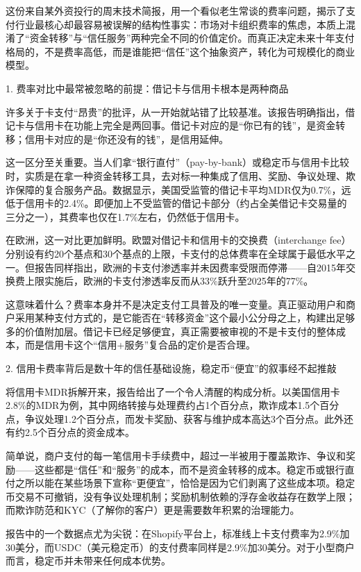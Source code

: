 \documentclass[11pt]{ctexart}
\begin{document}
这份来自某外资投行的周末技术简报，用一个看似老生常谈的费率问题，揭示了支付行业最核心却最容易被误解的结构性事实：市场对卡组织费率的焦虑，本质上混淆了“资金转移”与“信任服务”两种完全不同的价值定价。而真正决定未来十年支付格局的，不是费率高低，而是谁能把“信任”这个抽象资产，转化为可规模化的商业模型。

1. 费率对比中最常被忽略的前提：借记卡与信用卡根本是两种商品

许多关于卡支付“昂贵”的批评，从一开始就站错了比较基准。该报告明确指出，借记卡与信用卡在功能上完全是两回事。借记卡对应的是“你已有的钱”，是资金转移；信用卡对应的是“你还没有的钱”，是信用延伸。

这一区分至关重要。当人们拿“银行直付”（pay-by-bank）或稳定币与信用卡比较时，实质是在拿一种资金转移工具，去对标一种集成了信用、奖励、争议处理、欺诈保障的复合服务产品。数据显示，美国受监管的借记卡平均MDR仅为0.7\%，远低于信用卡的2.4\%。即便加上不受监管的借记卡部分（约占全美借记卡交易量的三分之一），其费率也仅在1.7\%左右，仍然低于信用卡。

在欧洲，这一对比更加鲜明。欧盟对借记卡和信用卡的交换费（interchange fee）分别设有约20个基点和30个基点的上限，卡支付的总体费率在全球属于最低水平之一。但报告同样指出，欧洲的卡支付渗透率并未因费率受限而停滞——自2015年交换费上限实施后，欧洲的卡支付渗透率反而从33\%跃升至2025年的77\%。

这意味着什么？费率本身并不是决定支付工具普及的唯一变量。真正驱动用户和商户采用某种支付方式的，是它能否在“转移资金”这个最小公分母之上，构建出足够多的价值附加层。借记卡已经足够便宜，真正需要被审视的不是卡支付的整体成本，而是信用卡这个“信用+服务”复合品的定价是否合理。

2. 信用卡费率背后是数十年的信任基础设施，稳定币“便宜”的叙事经不起推敲

将信用卡MDR拆解开来，报告给出了一个令人清醒的构成分析。以美国信用卡2.8\%的MDR为例，其中网络转接与处理费约占1个百分点，欺诈成本1.5个百分点，争议处理1.2个百分点，而发卡奖励、获客与维护成本高达3个百分点。此外还有约2.5个百分点的资金成本。

简单说，商户支付的每一笔信用卡手续费中，超过一半被用于覆盖欺诈、争议和奖励——这些都是“信任”和“服务”的成本，而不是资金转移的成本。稳定币或银行直付之所以能在某些场景下宣称“更便宜”，恰恰是因为它们剥离了这些成本项。稳定币交易不可撤销，没有争议处理机制；奖励机制依赖的浮存金收益存在数学上限；而欺诈防范和KYC（了解你的客户）更是需要数年积累的治理能力。

报告中的一个数据点尤为尖锐：在Shopify平台上，标准线上卡支付费率为2.9\%加30美分，而USDC（美元稳定币）的支付费率同样是2.9\%加30美分。对于小型商户而言，稳定币并未带来任何成本优势。
\end{document}
